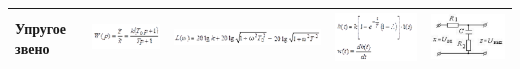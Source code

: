\documentclass[14pt,a4paper,report]{report}
\begin{document}
\begin{table}[h!]
\begin{tabular}{ | m{3cm} | m{3.5cm} | m{4.5cm} | m{2.5cm} | m{2.5cm} }
		Упругое звено
		&
		\begin{minipage}{.3\textwidth}
			\includegraphics[scale = 0.5]{images/8_2.png}
		\end{minipage}
		&
		\begin{minipage}{.3\textwidth}
			\includegraphics[scale = 0.35]{images/8_3_f.png}
		\end{minipage}
		&
		\begin{minipage}{.3\textwidth}
			\includegraphics[scale = 0.35]{images/8_4.png}
		\end{minipage}
		&
		\begin{minipage}{.3\textwidth}
			\includegraphics[scale = 0.40]{images/8_5.png}
		\end{minipage} \\ \hline
	\end{tabular}
	\egroup
\end{table}
\end{document}

